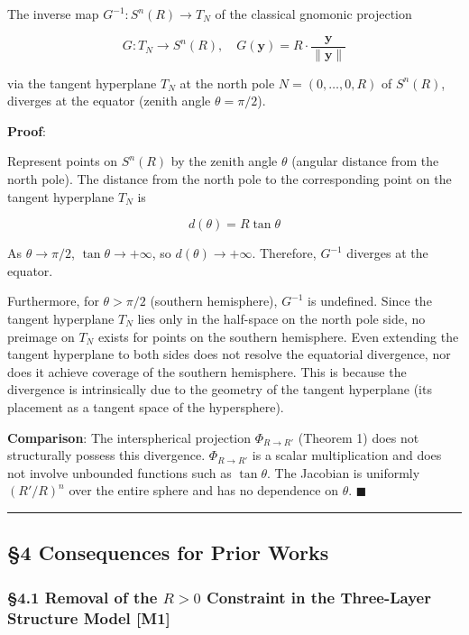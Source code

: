 \documentclass[
  a4paper]{article}
\begin{document}
The inverse map \(G^{-1} : S^n(R) \to T_N\) of the classical gnomonic
projection

\[
G : T_N \to S^n(R), \quad G(\mathbf{y}) = R \cdot \frac{\mathbf{y}}{\|\mathbf{y}\|}
\]

via the tangent hyperplane \(T_N\) at the north pole
\(N = (0, \ldots, 0, R)\) of \(S^n(R)\), diverges at the equator (zenith
angle \(\theta = \pi/2\)).

\textbf{Proof}:

Represent points on \(S^n(R)\) by the zenith angle \(\theta\) (angular
distance from the north pole). The distance from the north pole to the
corresponding point on the tangent hyperplane \(T_N\) is

\[
d(\theta) = R \tan\theta
\]

As \(\theta \to \pi/2\), \(\tan\theta \to +\infty\), so
\(d(\theta) \to +\infty\). Therefore, \(G^{-1}\) diverges at the
equator.

Furthermore, for \(\theta > \pi/2\) (southern hemisphere), \(G^{-1}\) is
undefined. Since the tangent hyperplane \(T_N\) lies only in the
half-space on the north pole side, no preimage on \(T_N\) exists for
points on the southern hemisphere. Even extending the tangent hyperplane
to both sides does not resolve the equatorial divergence, nor does it
achieve coverage of the southern hemisphere. This is because the
divergence is intrinsically due to the geometry of the tangent
hyperplane (its placement as a tangent space of the hypersphere).

\textbf{Comparison}: The interspherical projection \(\Phi_{R \to R'}\)
(Theorem 1) does not structurally possess this divergence.
\(\Phi_{R \to R'}\) is a scalar multiplication and does not involve
unbounded functions such as \(\tan\theta\). The Jacobian is uniformly
\((R'/R)^n\) over the entire sphere and has no dependence on \(\theta\).
\(\blacksquare\)

\begin{center}\rule{0.5\linewidth}{0.5pt}\end{center}

\subsection{§4 Consequences for Prior
Works}\label{consequences-for-prior-works}

\subsubsection{\texorpdfstring{§4.1 Removal of the \(R > 0\) Constraint
in the Three-Layer Structure Model
{[}M1{]}}{§4.1 Removal of the R \textgreater{} 0 Constraint in the Three-Layer Structure Model {[}M1{]}}}\label{removal-of-the-r-0-constraint-in-the-three-layer-structure-model-m1}
\end{document}
